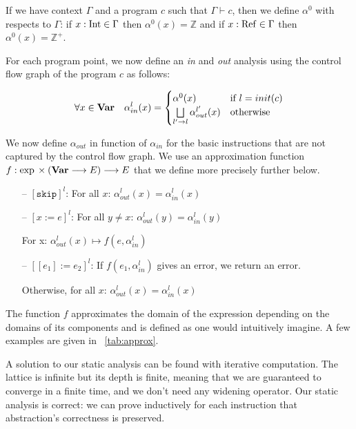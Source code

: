 If we have context $\Gamma$ and a program $c$ such that $\Gamma \vdash c$, then we define $\alpha^0$ with respects to $\Gamma$:
if $x: \mathrm{Int} \in \Gamma$ then $\alpha^0(x) = \mathbb{Z}$ and if $x: \mathrm{Ref} \in \Gamma$ then $\alpha^0(x) = \mathbb{Z}^{+}$.

For each program point, we now define an \emph{in} and \emph{out} analysis using the control flow graph of the program $c$ as follows:

\[
\forall x \in \mathbf{Var}{} \quad \alpha_{in}^l(x) =
	\begin{cases}
		\alpha^0(x) & \text{if $l = init(c)$} \\
		\bigsqcup\limits_{l' \rightarrow l} \alpha_{out}^{l'}(x) & \text{otherwise} \\
	\end{cases}
\]

We now define $\alpha_{out}$ in function of $\alpha_{in}$ for the basic instructions that are not captured by the control flow graph.
We use an approximation function $f: \exp{} \times (\mathbf{Var}{} \longrightarrow E) \longrightarrow E$ that we define more precisely further below.

\begin{itemize}
	\itemsep0em
	\item[--] $\left[\texttt{skip}\right]^l$: For all $x$: $\alpha_{out}^l(x) = \alpha_{in}^l(x)$
	\item[--] $\left[x := e\right]^l$: For all $y \neq x$: $\alpha_{out}^l(y) = \alpha_{in}^l(y)$
	
	For x: $\alpha_{out}^l(x) \mapsto f(e, \alpha_{in}^l)$
	\item[--] $\left[[e_1] := e_2\right]^l$: If $f(e_1, \alpha_{in}^l)$ gives an error, we return an error.
	
	Otherwise, for all $x$: $\alpha_{out}^l(x) = \alpha_{in}^l(x)$
\end{itemize}

The function $f$ approximates the domain of the expression depending on the domains of its components and is defined as one would intuitively imagine.
A few examples are given in \tablename~\ref{tab:approx}.

A solution to our static analysis can be found with iterative computation. The lattice is infinite but its depth is finite, meaning that we are guaranteed to converge in a finite time, and we don't need any widening operator.
Our static analysis is correct: we can prove inductively for each instruction that abstraction's correctness is preserved.

